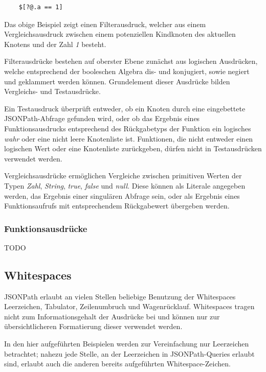 \documentclass[oneside]{ausarbeitung}
\begin{document}
\begin{lstlisting}
	$[?@.a == 1]
\end{lstlisting}
	
Das obige Beispiel zeigt einen Filterausdruck, welcher aus einem Vergleichsausdruck zwischen einem potenziellen Kindknoten des aktuellen Knotens und der Zahl \textit{1} besteht.
	
Filterausdrücke bestehen auf oberster Ebene zunächst aus logischen Ausdrücken, welche entsprechend der booleschen Algebra dis- und konjugiert, sowie negiert und geklammert werden können. Grundelement dieser Ausdrücke bilden Vergleichs- und Testausdrücke.
	
Ein Testausdruck überprüft entweder, ob ein Knoten durch eine eingebettete JSONPath-Abfrage gefunden wird, oder ob das Ergebnis eines Funktionsausdrucks entsprechend des Rückgabetyps der Funktion ein logisches \textit{wahr} oder eine nicht leere Knotenliste ist. Funktionen, die nicht entweder einen logischen Wert oder eine Knotenliste zurückgeben, dürfen nicht in Testausdrücken verwendet werden.
	
Vergleichsausdrücke ermöglichen Vergleiche zwischen primitiven Werten der Typen \textit{Zahl}, \textit{String}, \textit{true}, \textit{false} und \textit{null}. Diese können als Literale angegeben werden, das Ergebnis einer singulären Abfrage sein, oder als Ergebnis eines Funktionsaufrufs mit entsprechendem Rückgabewert übergeben werden.
	
\subsubsection{Funktionsausdrücke}
	
TODO
	
		

	
	
	
	
	
	
	
	
	
	
\subsection{Whitespaces}
	
JSONPath erlaubt an vielen Stellen beliebige Benutzung der Whitespaces Leerzeichen, Tabulator, Zeilenumbruch und Wagenrücklauf. Whitespaces tragen nicht zum Informationsgehalt der Ausdrücke bei und können nur zur übersichtlicheren Formatierung dieser verwendet werden. 
	
In den hier aufgeführten Beispielen werden zur Vereinfachung nur Leerzeichen betrachtet; nahezu jede Stelle, an der Leerzeichen in JSONPath-Queries erlaubt sind, erlaubt auch die anderen bereits aufgeführten Whitespace-Zeichen.
	
\end{document}
